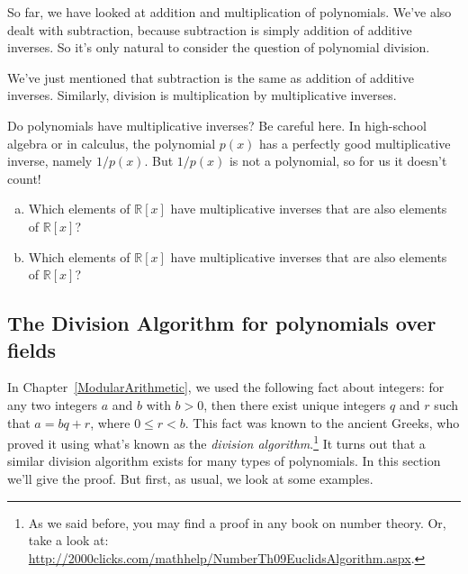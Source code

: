 So far, we have looked at addition and multiplication of polynomials. We've also dealt with subtraction, because subtraction is simply addition of additive inverses. So it's only natural to consider the question of polynomial division.

We've just mentioned that subtraction is the same as addition of additive inverses. Similarly, division is multiplication by multiplicative inverses.

Do polynomials have multiplicative inverses? Be careful here. In high-school algebra or in calculus,   the polynomial $p(x)$ has a perfectly good multiplicative inverse, namely  $1/p(x)$. But $1/p(x)$ is not a polynomial, so for us it doesn't count! 

\begin{exercise}{}
\begin{enumerate}[(a)]
\item
Which elements of $\mathbb{R}[x]$ have multiplicative inverses that are also elements of $\mathbb{R}[x]$?
\item
Which elements of $\mathbb{R}[x]$ have multiplicative inverses that are also elements of $\mathbb{R}[x]$?
\end{enumerate}
\end{exercise}

\subsection{The Division Algorithm for polynomials over fields\quad
{}}\label{sec:Polynomials:PolynomialsAndDivision:divisionalgorithm}
In Chapter~\ref{ModularArithmetic}, we used the following fact about integers: for any two integers $a$ and $b$  with $b > 0$, then there exist unique
integers $q$ and $r$ such that $a = bq+r$, where $0 \leq r < b$. This fact was known to the ancient Greeks, who proved it using what's known as the \emph{division algorithm}.\footnote{As we said before, you may find a proof in any book on number theory. Or, take a look at:  \url{http://2000clicks.com/mathhelp/NumberTh09EuclidsAlgorithm.aspx}.} It turns out that a similar
division algorithm exists for many types of
polynomials. In this section we'll  give the proof. But first, as usual, we look at some examples.

